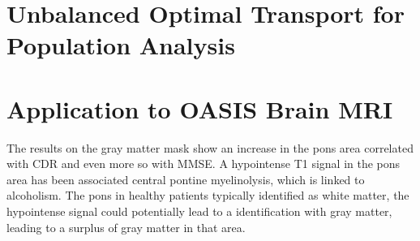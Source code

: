 \documentclass{llncs}
\begin{document}
\section{Unbalanced Optimal Transport for Population Analysis}

\section{Application to OASIS Brain MRI}

The results on the gray matter mask show an increase in the pons area
correlated with CDR and even more so with MMSE.  A hypointense T1 signal in the
pons area has been associated central pontine myelinolysis, which is linked to
alcoholism. The pons in healthy patients typically identified as white matter,
the hypointense signal could potentially lead to a identification with gray
matter, leading to a surplus of gray matter in that area.
\end{document}
